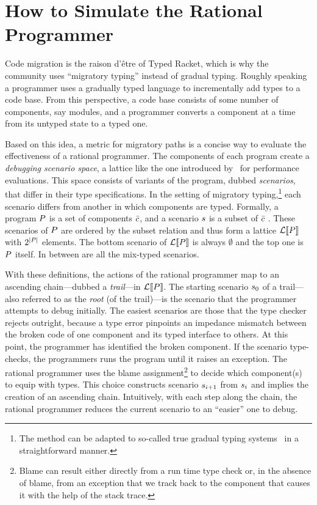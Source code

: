 \section{How to Simulate the Rational Programmer} 

Code migration is the raison d'\^etre of Typed Racket, which is why the community
uses ``migratory typing'' instead of gradual typing. Roughly speaking a
programmer uses a gradually typed language to incrementally add types to a code
base. From this perspective, a code base consists of some number of components,
say modules, and a programmer converts a component at a time from its untyped
state to a typed one. 

Based on this idea, a metric for migratory paths is a concise way to
evaluate the effectiveness of a rational programmer. The components of
each program create a \emph{debugging scenario space}, a lattice like
the one introduced by~\citet{tfgnvf-popl-2016} for performance
evaluations. This space consists of variants of the program, dubbed
\emph{scenarios}, that differ in their type specifications. In the
setting of migratory typing,\footnote{The method can be adapted to
so-called true gradual typing systems~\cite{svcb-snapl-2015} in a
straightforward manner.} each scenario differs from another in which
components are typed. Formally, a program $P$ is a set of
components $\bar{c}$, and a scenario $s$ is a subset of
$\bar{c}$ . These scenarios of $P$ are ordered by the
subset relation and thus form a lattice $\mathcal{L}\llbracket P\rrbracket$ with
$2^{\mid P \mid}$ elements.  The bottom scenario of
$\mathcal{L}\llbracket P\rrbracket$ is always $\emptyset$ and the top one is $P$
itself. In between are all the mix-typed scenarios.

With these definitions, the actions of the rational programmer map to
an ascending chain---dubbed a \emph{trail}---in $\mathcal{L}\llbracket P\rrbracket$.
The starting scenario $s_0$ of a trail---also referred to as the
\emph{root} (of the trail)---is the scenario that the programmer
attempts to debug initially. The easiest scenarios are those that the
type checker rejects outright, because a type error pinpoints an
impedance mismatch between the broken code of one component and its
typed interface to others. At this point, the programmer has
identified the broken component. If the scenario type-checks, the
programmers runs the program until it raises an exception.  The
rational programmer uses the blame assignment\footnote{Blame can
result either directly from a run time type check or, in the absence
of blame, from an exception that we track back to the component that
causes it with the help of the stack trace.} to decide which
component(s) to equip with types. This choice constructs scenario
$s_{i+1}$ from $s_{i}$ and implies the creation of an
ascending chain.  Intuitively, with each step along the chain, the
rational programmer reduces the current scenario to an ``easier'' one
to debug.

